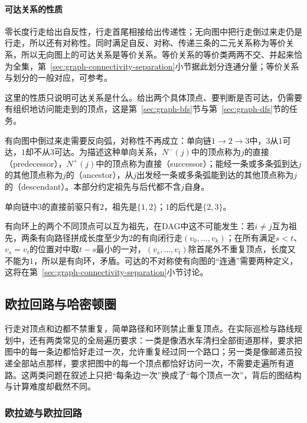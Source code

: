 \paragraph{可达关系的性质}
零长度行走给出自反性，行走首尾相接给出传递性；无向图中把行走倒过来走仍是行走，所以还有对称性。同时满足自反、对称、传递三条的二元关系称为等价关系，所以无向图上的可达关系是等价关系。等价关系的等价类两两不交、并起来恰为全集，第~\ref{sec:graph-connectivity-separation}小节据此划分连通分量；等价关系与划分的一般对应，可参考。

这里的性质只说明可达关系是什么。给出两个具体顶点、要判断是否可达，仍需要有组织地访问能走到的顶点，这是第~\ref{sec:graph-bfs}节与第~\ref{sec:graph-dfs}节的任务。

有向图中倒过来走需要反向弧，对称性不再成立：单向链$1\to2\to3$中，$3$从$1$可达，$1$却不从$3$可达。为描述这种单向关系，$N^-(j)$中的顶点称为$j$的直接（predecessor），$N^+(j)$中的顶点称为直接（successor）；能经一条或多条弧到达$j$的其他顶点称为$j$的（ancestor），从$j$出发经一条或多条弧能到达的其他顶点称为$j$的（descendant）。本部分约定祖先与后代都不含$j$自身。

单向链中$3$的直接前驱只有$2$，祖先是$\{1,2\}$；$1$的后代是$\{2,3\}$。

有向环上的两个不同顶点可以互为祖先，在DAG中这不可能发生：若$i\neq j$互为祖先，两条有向路径拼成长度至少为$2$的有向闭行走$(v_0,\ldots,v_k)$；在所有满足$s<t$、$v_s=v_t$的位置对中取$t-s$最小的一对，$(v_s,\ldots,v_t)$除首尾外不重复顶点，长度又不能为$1$，所以是有向环，矛盾。可达的不对称使有向图的“连通”需要两种定义，这将在第~\ref{sec:graph-connectivity-separation}小节讨论。

\subsection{欧拉回路与哈密顿圈}
\label{sec:graph-euler-hamilton}

行走对顶点和边都不禁重复，简单路径和环则禁止重复顶点。在实际巡检与路线规划中，还有两类常见的全局遍历要求：一类是像洒水车清扫全部街道那样，要求把图中的每一条边都恰好走过一次，允许重复经过同一个路口；另一类是像邮递员投递全部站点那样，要求把图中的每一个顶点都恰好访问一次，不需要走遍所有道路。这两类问题在叙述上只把“每条边一次”换成了“每个顶点一次”，背后的图结构与计算难度却截然不同。

\subsubsection{欧拉迹与欧拉回路}
\label{sec:graph-euler-circuit}

